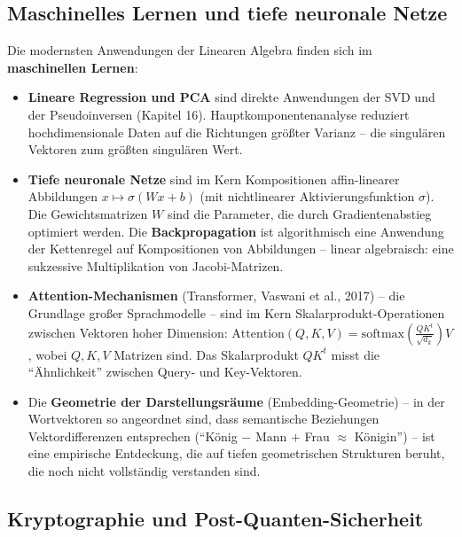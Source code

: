 ﻿\documentclass[a4paper,12pt]{report}
\theoremstyle{definition}
\begin{document}
\subsection*{Maschinelles Lernen und tiefe neuronale Netze}

Die modernsten Anwendungen der Linearen Algebra finden sich im
\textbf{maschinellen Lernen}:
\begin{itemize}
    \item[-] \textbf{Lineare Regression und PCA} sind direkte
          Anwendungen der SVD und der Pseudoinversen (Kapitel 16).
          Hauptkomponentenanalyse reduziert hochdimensionale Daten
          auf die Richtungen größter Varianz -- die singulären
          Vektoren zum größten singulären Wert.
    \item[-] \textbf{Tiefe neuronale Netze} sind im Kern Kompositionen
          affin-linearer Abbildungen $x \mapsto \sigma(Wx + b)$
          (mit nichtlinearer Aktivierungsfunktion $\sigma$).
          Die Gewichtsmatrizen $W$ sind die Parameter, die durch
          Gradientenabstieg optimiert werden. Die
          \textbf{Backpropagation} ist algorithmisch eine Anwendung
          der Kettenregel auf Kompositionen von Abbildungen --
          linear algebraisch: eine sukzessive Multiplikation von
          Jacobi-Matrizen.
    \item[-] \textbf{Attention-Mechanismen} (Transformer, Vaswani et al.,
          2017) -- die Grundlage großer Sprachmodelle -- sind
          im Kern Skalarprodukt-Operationen zwischen Vektoren
          hoher Dimension: $\mathrm{Attention}(Q, K, V) =
          \mathrm{softmax}\!\left(\frac{QK^t}{\sqrt{d_k}}\right)V$,
          wobei $Q, K, V$ Matrizen sind. Das Skalarprodukt $QK^t$
          misst die ``Ähnlichkeit'' zwischen Query- und Key-Vektoren.
    \item[-] Die \textbf{Geometrie der Dar\-stellungs\-räu\-me}
          (Embedding-Geometrie) -- in der Wortvektoren so
          angeordnet sind, dass semantische Beziehungen
          Vektordifferenzen entsprechen (``König $-$ Mann $+$
          Frau $\approx$ Königin'') -- ist eine empirische
          Entdeckung, die auf tiefen geometrischen Strukturen
          beruht, die noch nicht vollständig verstanden sind.
\end{itemize}

\subsection*{Kryptographie und Post-Quanten-Sicherheit}
\end{document}
